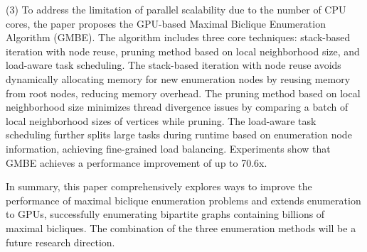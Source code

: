 (3) To address the limitation of parallel scalability due to the number of CPU cores, the paper proposes the GPU-based Maximal Biclique Enumeration Algorithm (GMBE). The algorithm includes three core techniques: stack-based iteration with node reuse, pruning method based on local neighborhood size, and load-aware task scheduling. The stack-based iteration with node reuse avoids dynamically allocating memory for new enumeration nodes by reusing memory from root nodes, reducing memory overhead. The pruning method based on local neighborhood size minimizes thread divergence issues by comparing a batch of local neighborhood sizes of vertices while pruning. The load-aware task scheduling further splits large tasks during runtime based on enumeration node information, achieving fine-grained load balancing. Experiments show that GMBE achieves a performance improvement of up to 70.6x.

In summary, this paper comprehensively explores ways to improve the performance of maximal biclique enumeration problems and extends enumeration to GPUs, successfully enumerating bipartite graphs containing billions of maximal bicliques. The combination of the three enumeration methods will be a future research direction.









